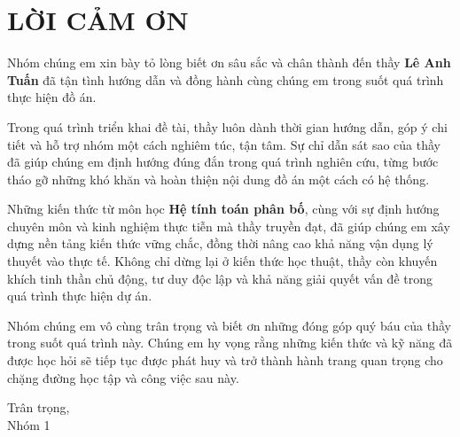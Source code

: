 \chapter*{\centering\Large{LỜI CẢM ƠN}}

Nhóm chúng em xin bày tỏ lòng biết ơn sâu sắc và chân thành đến thầy \textbf{Lê Anh Tuấn} 
đã tận tình hướng dẫn và đồng hành cùng chúng em trong suốt quá trình thực hiện đồ án.

Trong quá trình triển khai đề tài, thầy luôn dành thời gian hướng dẫn, góp ý chi tiết 
và hỗ trợ nhóm một cách nghiêm túc, tận tâm. Sự chỉ dẫn sát sao của thầy đã giúp chúng em 
định hướng đúng đắn trong quá trình nghiên cứu, từng bước tháo gỡ những khó khăn và hoàn thiện nội dung đồ án một cách có hệ thống.

Những kiến thức từ môn học \textbf{Hệ tính toán phân bố}, cùng với sự định hướng chuyên môn 
và kinh nghiệm thực tiễn mà thầy truyền đạt, đã giúp chúng em xây dựng nền tảng kiến thức 
vững chắc, đồng thời nâng cao khả năng vận dụng lý thuyết vào thực tế. Không chỉ dừng lại 
ở kiến thức học thuật, thầy còn khuyến khích tinh thần chủ động, tư duy độc lập và khả năng 
giải quyết vấn đề trong quá trình thực hiện dự án.

Nhóm chúng em vô cùng trân trọng và biết ơn những đóng góp quý báu của thầy trong suốt quá trình này. 
Chúng em hy vọng rằng những kiến thức và kỹ năng đã được học hỏi sẽ tiếp tục được phát huy 
và trở thành hành trang quan trọng cho chặng đường học tập và công việc sau này.

\begin{flushright}
Trân trọng,\\
Nhóm 1
\end{flushright}
